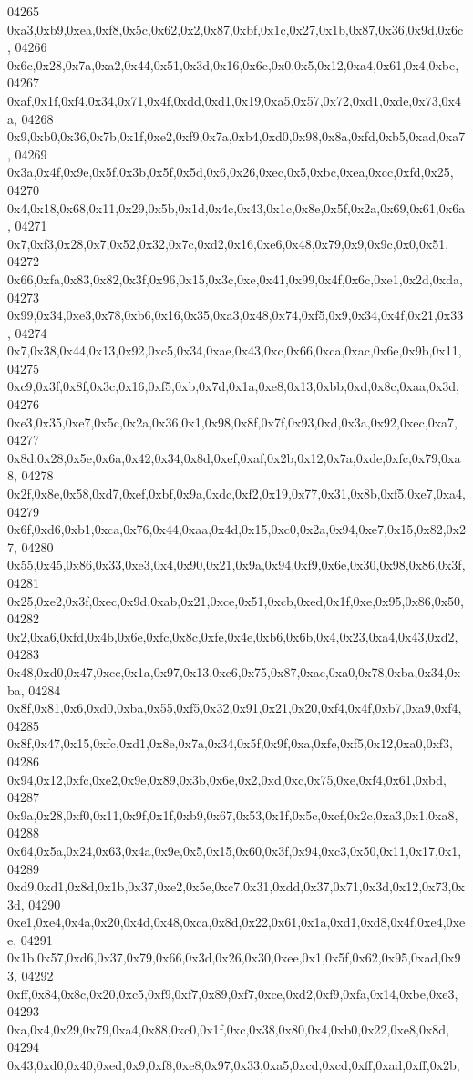\begin{DoxyCode}
04265   0xa3,0xb9,0xea,0xf8,0x5c,0x62,0x2,0x87,0xbf,0x1c,0x27,0x1b,0x87,0x36,0x9d,0x6c,
04266   0x6c,0x28,0x7a,0xa2,0x44,0x51,0x3d,0x16,0x6e,0x0,0x5,0x12,0xa4,0x61,0x4,0xbe,
04267   0xaf,0x1f,0xf4,0x34,0x71,0x4f,0xdd,0xd1,0x19,0xa5,0x57,0x72,0xd1,0xde,0x73,0x4a,
04268   0x9,0xb0,0x36,0x7b,0x1f,0xe2,0xf9,0x7a,0xb4,0xd0,0x98,0x8a,0xfd,0xb5,0xad,0xa7,
04269   0x3a,0x4f,0x9e,0x5f,0x3b,0x5f,0x5d,0x6,0x26,0xec,0x5,0xbc,0xea,0xcc,0xfd,0x25,
04270   0x4,0x18,0x68,0x11,0x29,0x5b,0x1d,0x4c,0x43,0x1c,0x8e,0x5f,0x2a,0x69,0x61,0x6a,
04271   0x7,0xf3,0x28,0x7,0x52,0x32,0x7c,0xd2,0x16,0xe6,0x48,0x79,0x9,0x9c,0x0,0x51,
04272   0x66,0xfa,0x83,0x82,0x3f,0x96,0x15,0x3c,0xe,0x41,0x99,0x4f,0x6c,0xe1,0x2d,0xda,
04273   0x99,0x34,0xe3,0x78,0xb6,0x16,0x35,0xa3,0x48,0x74,0xf5,0x9,0x34,0x4f,0x21,0x33,
04274   0x7,0x38,0x44,0x13,0x92,0xc5,0x34,0xae,0x43,0xc,0x66,0xca,0xac,0x6e,0x9b,0x11,
04275   0xc9,0x3f,0x8f,0x3c,0x16,0xf5,0xb,0x7d,0x1a,0xe8,0x13,0xbb,0xd,0x8c,0xaa,0x3d,
04276   0xe3,0x35,0xe7,0x5c,0x2a,0x36,0x1,0x98,0x8f,0x7f,0x93,0xd,0x3a,0x92,0xec,0xa7,
04277   0x8d,0x28,0x5e,0x6a,0x42,0x34,0x8d,0xef,0xaf,0x2b,0x12,0x7a,0xde,0xfc,0x79,0xa8,
04278   0x2f,0x8e,0x58,0xd7,0xef,0xbf,0x9a,0xdc,0xf2,0x19,0x77,0x31,0x8b,0xf5,0xe7,0xa4,
04279   0x6f,0xd6,0xb1,0xca,0x76,0x44,0xaa,0x4d,0x15,0xc0,0x2a,0x94,0xe7,0x15,0x82,0x27,
04280   0x55,0x45,0x86,0x33,0xe3,0x4,0x90,0x21,0x9a,0x94,0xf9,0x6e,0x30,0x98,0x86,0x3f,
04281   0x25,0xe2,0x3f,0xec,0x9d,0xab,0x21,0xce,0x51,0xcb,0xed,0x1f,0xe,0x95,0x86,0x50,
04282   0x2,0xa6,0xfd,0x4b,0x6e,0xfc,0x8c,0xfe,0x4e,0xb6,0x6b,0x4,0x23,0xa4,0x43,0xd2,
04283   0x48,0xd0,0x47,0xcc,0x1a,0x97,0x13,0xc6,0x75,0x87,0xac,0xa0,0x78,0xba,0x34,0xba,
04284   0x8f,0x81,0x6,0xd0,0xba,0x55,0xf5,0x32,0x91,0x21,0x20,0xf4,0x4f,0xb7,0xa9,0xf4,
04285   0x8f,0x47,0x15,0xfc,0xd1,0x8e,0x7a,0x34,0x5f,0x9f,0xa,0xfe,0xf5,0x12,0xa0,0xf3,
04286   0x94,0x12,0xfc,0xe2,0x9e,0x89,0x3b,0x6e,0x2,0xd,0xc,0x75,0xe,0xf4,0x61,0xbd,
04287   0x9a,0x28,0xf0,0x11,0x9f,0x1f,0xb9,0x67,0x53,0x1f,0x5c,0xcf,0x2c,0xa3,0x1,0xa8,
04288   0x64,0x5a,0x24,0x63,0x4a,0x9e,0x5,0x15,0x60,0x3f,0x94,0xc3,0x50,0x11,0x17,0x1,
04289   0xd9,0xd1,0x8d,0x1b,0x37,0xe2,0x5e,0xc7,0x31,0xdd,0x37,0x71,0x3d,0x12,0x73,0x3d,
04290   0xe1,0xe4,0x4a,0x20,0x4d,0x48,0xca,0x8d,0x22,0x61,0x1a,0xd1,0xd8,0x4f,0xe4,0xee,
04291   0x1b,0x57,0xd6,0x37,0x79,0x66,0x3d,0x26,0x30,0xee,0x1,0x5f,0x62,0x95,0xad,0x93,
04292   0xff,0x84,0x8c,0x20,0xc5,0xf9,0xf7,0x89,0xf7,0xce,0xd2,0xf9,0xfa,0x14,0xbe,0xe3,
04293   0xa,0x4,0x29,0x79,0xa4,0x88,0xc0,0x1f,0xc,0x38,0x80,0x4,0xb0,0x22,0xe8,0x8d,
04294   0x43,0xd0,0x40,0xed,0x9,0xf8,0xe8,0x97,0x33,0xa5,0xcd,0xcd,0xff,0xad,0xff,0x2b,

\end{DoxyCode}
